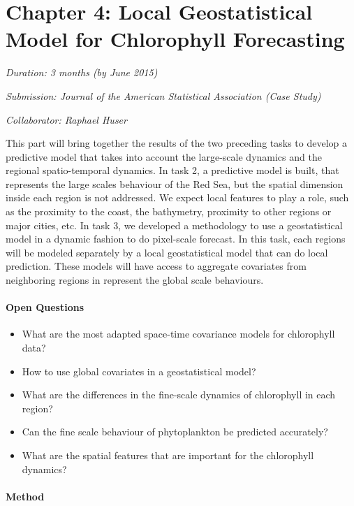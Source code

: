 \section{Chapter 4: Local Geostatistical Model for Chlorophyll Forecasting}

\noindent
\emph{Duration: 3 months (by June 2015)}

\noindent
\emph{Submission: Journal of the American Statistical Association (Case Study)}

\noindent
\emph{Collaborator: Raphael Huser}

This part will bring together the results of the two preceding tasks to develop a predictive model that takes into account the large-scale dynamics and the regional spatio-temporal dynamics. In task 2, a predictive model is built, that represents the large scales behaviour of the Red Sea, but the spatial dimension inside each region is not addressed. We expect local features to play a role, such as the proximity to the coast, the bathymetry, proximity to other regions or major cities, etc. In task 3, we developed a methodology to use a geostatistical model in a dynamic fashion to do pixel-scale forecast. In this task, each regions will be modeled separately by a local geostatistical model that can do local prediction. These models will have access to aggregate covariates from neighboring regions in represent the global scale behaviours. 

\paragraph{Open Questions}

\begin{itemize}
\item What are the most adapted space-time covariance models for chlorophyll data?
\item How to use global covariates in a geostatistical model?
\item What are the differences in the fine-scale dynamics of chlorophyll in each region?
\item Can the fine scale behaviour of phytoplankton be predicted accurately?
\item What are the spatial features that are important for the chlorophyll dynamics?
\end{itemize}

\paragraph{Method}

